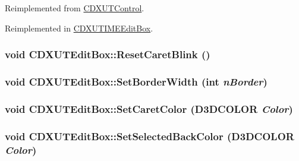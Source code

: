 Reimplemented from \hyperlink{class_c_d_x_u_t_control_afd92fa04241f66fdbf207bc5870c9388}{CDXUTControl}.

Reimplemented in \hyperlink{class_c_d_x_u_t_i_m_e_edit_box_aa473937c56d6feef6777fd62b4d5a48c}{CDXUTIMEEditBox}.\hypertarget{class_c_d_x_u_t_edit_box_af04922715d7f262b0e21a98e969f6e9c}{
\subsubsection[{ResetCaretBlink}]{\setlength{\rightskip}{0pt plus 5cm}void CDXUTEditBox::ResetCaretBlink ()}}
\label{class_c_d_x_u_t_edit_box_af04922715d7f262b0e21a98e969f6e9c}
\hypertarget{class_c_d_x_u_t_edit_box_af9b5c04a9cdda81761cc04d7e70a6a06}{
\subsubsection[{SetBorderWidth}]{\setlength{\rightskip}{0pt plus 5cm}void CDXUTEditBox::SetBorderWidth ({\bf int} {\em nBorder})}}
\label{class_c_d_x_u_t_edit_box_af9b5c04a9cdda81761cc04d7e70a6a06}
\hypertarget{class_c_d_x_u_t_edit_box_afb8d2b7593862e875daf4b4a63080ddf}{
\subsubsection[{SetCaretColor}]{\setlength{\rightskip}{0pt plus 5cm}void CDXUTEditBox::SetCaretColor (D3DCOLOR {\em Color})}}
\label{class_c_d_x_u_t_edit_box_afb8d2b7593862e875daf4b4a63080ddf}
\hypertarget{class_c_d_x_u_t_edit_box_ae43b2c8142d3ce9602ae73193b0982fe}{
\subsubsection[{SetSelectedBackColor}]{\setlength{\rightskip}{0pt plus 5cm}void CDXUTEditBox::SetSelectedBackColor (D3DCOLOR {\em Color})}}
